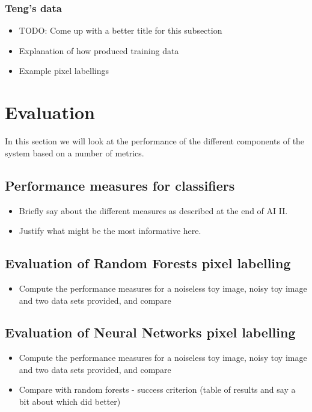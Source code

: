 \documentclass[12pt,twoside,notitlepage]{report}
\begin{document}
        \subsection{Teng's data}
            \begin{itemize}
                \item TODO: Come up with a better title for this subsection
                \item Explanation of how produced training data
                \item Example pixel labellings
            \end{itemize}









\cleardoublepage
\chapter{Evaluation}
    In this section we will look at the performance of the different components of the system based on a number of 
    metrics. 

    \section{Performance measures for classifiers}
        \begin{itemize}
            \item Briefly say about the different measures as described at the end of AI II.
            \item Justify what might be the most informative here.
        \end{itemize}

    \section{Evaluation of Random Forests pixel labelling}
        \begin{itemize}
            \item Compute the performance measures for a noiseless toy image, noisy toy image and two data sets provided, and compare
        \end{itemize}


    \section{Evaluation of Neural Networks pixel labelling}
        \begin{itemize}
            \item Compute the performance measures for a noiseless toy image, noisy toy image and two data sets provided, and compare
            \item Compare with random forests - success criterion (table of results and say a bit about which did better)
        \end{itemize}
\end{document}
